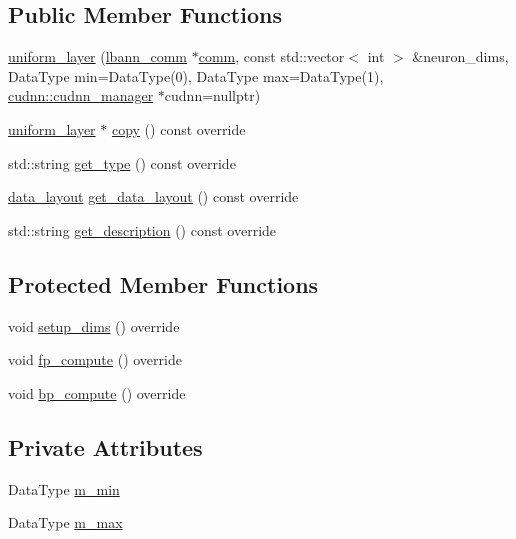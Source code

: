 \subsection*{Public Member Functions}
\begin{DoxyCompactItemize}
\item 
\hyperlink{classlbann_1_1uniform__layer_a9ed147e3edd3d4556d0130a77a790f08}{uniform\+\_\+layer} (\hyperlink{classlbann_1_1lbann__comm}{lbann\+\_\+comm} $\ast$\hyperlink{file__io_8cpp_ab048c6f9fcbcfaa57ce68b00263dbebe}{comm}, const std\+::vector$<$ int $>$ \&neuron\+\_\+dims, Data\+Type min=Data\+Type(0), Data\+Type max=Data\+Type(1), \hyperlink{classlbann_1_1cudnn_1_1cudnn__manager}{cudnn\+::cudnn\+\_\+manager} $\ast$cudnn=nullptr)
\item 
\hyperlink{classlbann_1_1uniform__layer}{uniform\+\_\+layer} $\ast$ \hyperlink{classlbann_1_1uniform__layer_a3d148d514eaf8524a8ad3ec13ab69d59}{copy} () const override
\item 
std\+::string \hyperlink{classlbann_1_1uniform__layer_aeae476799ac7ed20ba21f39841352e47}{get\+\_\+type} () const override
\item 
\hyperlink{base_8hpp_a786677cbfb3f5677b4d84f3056eb08db}{data\+\_\+layout} \hyperlink{classlbann_1_1uniform__layer_adacae6beb724aa10b7f625b1418e9015}{get\+\_\+data\+\_\+layout} () const override
\item 
std\+::string \hyperlink{classlbann_1_1uniform__layer_a41b8f6ed59de66dda1f95a6b4ee4762f}{get\+\_\+description} () const override
\end{DoxyCompactItemize}
\subsection*{Protected Member Functions}
\begin{DoxyCompactItemize}
\item 
void \hyperlink{classlbann_1_1uniform__layer_a60dfb64110369be8f9802c9e010cfbd1}{setup\+\_\+dims} () override
\item 
void \hyperlink{classlbann_1_1uniform__layer_a975ba9cfcd974fe348ee9681d1feb879}{fp\+\_\+compute} () override
\item 
void \hyperlink{classlbann_1_1uniform__layer_a40cec806825a1cb07f66867d0350dd1c}{bp\+\_\+compute} () override
\end{DoxyCompactItemize}
\subsection*{Private Attributes}
\begin{DoxyCompactItemize}
\item 
Data\+Type \hyperlink{classlbann_1_1uniform__layer_ad2da58c380cf2803da709dd936c19aa1}{m\+\_\+min}
\item 
Data\+Type \hyperlink{classlbann_1_1uniform__layer_a45004689408c17baf76399f64489c8d4}{m\+\_\+max}
\end{DoxyCompactItemize}

